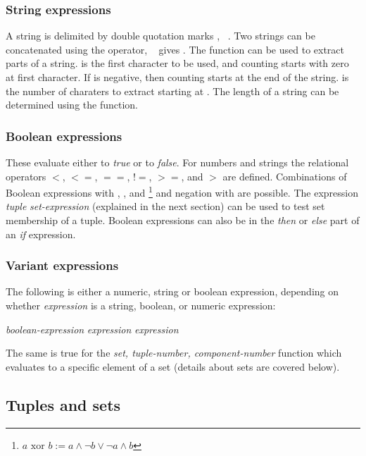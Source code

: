 \subsubsection{String expressions}
A string is delimited by double quotation marks ,
\eg\ . Two strings can be concatenated using the
\code{+} operator, \ie\  gives . The function 
can be used to extract parts of a string.  is the first character
to be used, and counting starts with zero at first character.
If  is negative, then counting starts
at the end of the string.  is the number of charaters to extract
starting at . The length of a string can be determined
using the  function.


\subsubsection{Boolean expressions}
These evaluate either to \emph{true} or to \emph{false}. For numbers and
strings the
relational operators $<$, $<=$, $==$, $!\!\!=$, $>=$, and $>$ are
defined.
Combinations of Boolean expressions with ,
, and
\footnote{$a \text{ xor } b :=a\wedge\neg b\vee \neg a\wedge b$}
and negation with  are possible.
The expression \emph{tuple}  \emph{set-expression} (explained
in the next section) can be used to test set membership of a tuple.
Boolean expressions can also be in the \emph{then} or \emph{else} part of an
\emph{if} expression.

\subsubsection{Variant expressions}
The following is either a numeric, string or boolean expression, depending on
whether \emph{expression} is a string, boolean, or numeric expression:

\smallskip
{} \emph{boolean-expression} 
\emph{expression}  \emph{expression} 

\smallskip
\noindent The same is true for the \emph{set,
  tuple-number, component-number}\code{)} function which evaluates to
a specific element of a set (details about sets are covered below).


\subsection{Tuples and sets}

